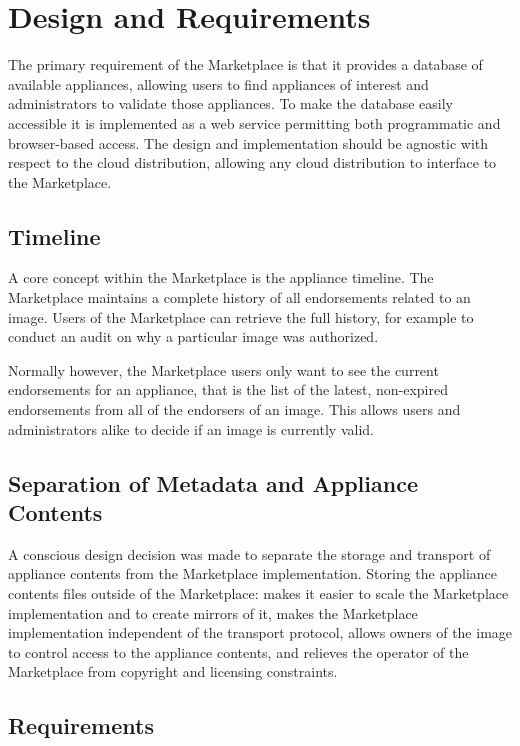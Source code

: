 \section{Design and Requirements}
\label{sec:design}

The primary requirement of the Marketplace is that it provides a
database of available appliances, allowing users to find appliances of
interest and administrators to validate those appliances.  To make the
database easily accessible it is implemented as a web service permitting
both programmatic and browser-based access.  The design and
implementation should be agnostic with respect to the cloud
distribution, allowing any cloud distribution to interface to the
Marketplace\@.

\subsection{Timeline}

A core concept within the Marketplace is the appliance timeline.  The
Marketplace maintains a complete history of all endorsements related
to an image.  Users of the Marketplace can retrieve the full history,
for example to conduct an audit on why a particular image was
authorized.

Normally however, the Marketplace users only want to see the current
endorsements for an appliance, that is the list of the latest,
non-expired endorsements from all of the endorsers of an image.  This
allows users and administrators alike to decide if an image is
currently valid.

\subsection{Separation of Metadata and Appliance Contents}

A conscious design decision was made to separate the storage and
transport of appliance contents from the Marketplace implementation.
Storing the appliance contents files outside of the Marketplace: makes
it easier to scale the Marketplace implementation and to create
mirrors of it, makes the Marketplace implementation independent of the
transport protocol, allows owners of the image to control access to
the appliance contents, and relieves the operator of the Marketplace
from copyright and licensing constraints.

\subsection{Requirements}

